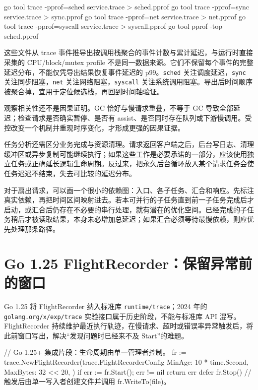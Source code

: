 \documentclass[UTF8,fontset=fandol,openany,11pt]{ctexbook}
\begin{document}
\begin{codeblock}
go tool trace -pprof=sched service.trace > sched.pprof
go tool trace -pprof=sync service.trace > sync.pprof
go tool trace -pprof=net service.trace > net.pprof
go tool trace -pprof=syscall service.trace > syscall.pprof
go tool pprof -top sched.pprof
\end{codeblock}

这些文件从 trace 事件推导出按调用栈聚合的事件计数与累计延迟，与运行时直接采集的 CPU/block/mutex profile 不是同一数据来源。它们不保留每个事件的完整延迟分布，不能仅凭导出结果恢复事件延迟的 p99。\texttt{sched} 关注调度延迟，\texttt{sync} 关注同步阻塞，\texttt{net} 关注网络阻塞，\texttt{syscall} 关注系统调用阻塞。导出后时间顺序被聚合掉，宜用于定位候选栈，再回到时间轴验证。\cite{tools-trace-cmd}

观察相关性还不是因果证明。GC 恰好与慢请求重叠，不等于 GC 导致全部延迟；检查请求是否确实暂停、是否有 assist、是否同时存在队列或下游慢调用。受控改变一个机制并重现时序变化，才形成更强的因果证据。

任务分析还需区分业务完成与资源清理。请求返回客户端之后，后台写日志、清理缓冲区或异步复制可能继续执行；如果这些工作是必要承诺的一部分，应该使用独立任务或正确延长逻辑生命周期。反过来，把永久后台循环放入某个请求任务会使任务迟迟不结束，失去可比较的延迟分布。

对于扇出请求，可以画一个很小的依赖图：入口、各子任务、汇合和响应。先标注真实依赖，再把时间区间映射进去。若本可并行的子任务直到前一子任务完成后才启动，或汇合后仍存在不必要的串行处理，就有潜在的优化空间。已经完成的子任务稍后才被读取结果，本身未必增加总延迟；如果汇合必须等待最慢依赖，则应优先处理那条路径。

\section{Go 1.25 FlightRecorder：保留异常前的窗口}
Go 1.25 将 FlightRecorder 纳入标准库 \texttt{runtime/\allowbreak{}trace}；2024 年的 \texttt{golang.\allowbreak{}org/\allowbreak{}x/\allowbreak{}exp/\allowbreak{}trace} 实验接口属于历史阶段，不能与标准库 API 混写。FlightRecorder 持续维护最近执行轨迹，在慢请求、超时或错误率异常触发后，将此前窗口写出，解决“发现问题时已经来不及 Start”的难题。\cite{tools-go125}\cite{tools-flight-blog}

\begin{codeblock}
// Go 1.25+ 集成片段：生命周期由单一管理者控制。
fr := trace.NewFlightRecorder(trace.FlightRecorderConfig{
    MinAge: 10 * time.Second,
    MaxBytes: 32 << 20,
})
if err := fr.Start(); err != nil { return err }
defer fr.Stop()
// 触发后由单一写入者创建文件并调用 fr.WriteTo(file)。
\end{codeblock}
\end{document}
